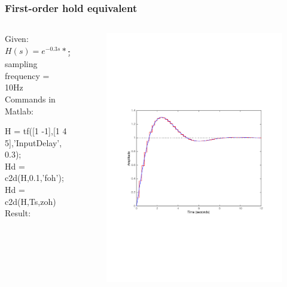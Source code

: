 \begin{frame}
	\frametitle{First-order hold equivalent}
\begin{columns}
	\begin{column}{0.6\textwidth}
	\begin{example}
	Given:\\
	$H(s) = e^{-0.3s} * \frac{s-1}{s^{2} + 4*s + 5} $\\
	sampling frequency = 10Hz\\
	\vspace{1em}
	Commands in Matlab:
	
	H = tf([1 -1],[1 4 5],'InputDelay', 0.3);\\
	Hd = c2d(H,0.1,'foh');\\
	Hd = c2d(H,Ts,zoh)\\
	\vspace{1em}
	Result:
	\end{example}
	\end{column}
	
	\begin{column}{0.4\textwidth}
		\begin{figure}
			\centering
			\includegraphics[width=1\linewidth]{vb2}
		\end{figure}
	\end{column}
\end{columns}
\end{frame}